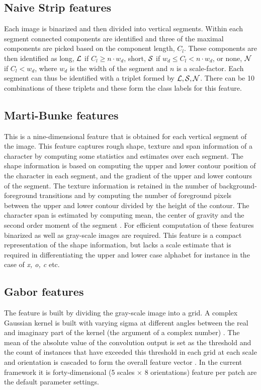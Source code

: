 \documentclass[runningheads]{llncs}
\def\L{{\cal L}}
\def\S{{\cal S}}
\def\N{{\cal N}}
\begin{document}
\subsection{Naive Strip features}
\label{ssec:nsf}
Each image is binarized and then divided into vertical segments. Within each segment connected components are identified and three of the maximal components are picked based on the component length, $C_l$. These components are then identified as long, $\L$ if $C_l \ge n\cdot w_d$, short, $\S$ if $w_d \le C_l < n \cdot w_d$, or none, $\N$ if $ C_l < w_d$, where $w_d$ is the width of the segment and $n$ is a scale-factor. Each segment can thus be identified with a triplet formed by $\L,\S,\N$. There can be 10 combinations of these triplets and these form the class labels for this feature.

\subsection{Marti-Bunke features}
\label{ssec:mbf}
This is a nine-dimensional feature that is obtained for each vertical segment of the image. This feature captures rough shape, texture and span information of a character by computing some statistics and estimates over each segment. The shape information is based on computing the upper and lower contour position of the character in each segment, and the gradient of the upper and lower contours of the segment. The texture information is retained in the number of background-foreground transitions and by computing the number of foreground pixels between the upper and lower contour divided by the height of the contour. The character span is estimated by computing mean, the center of gravity and the second order moment of the segment \cite{MartiBunke02}. For efficient computation of these features binarized as well as gray-scale images are required. This feature is a compact representation of the shape information, but lacks a scale estimate that is required in differentiating the upper and lower case alphabet for instance in the case  of \emph{x, o, c} etc.

\subsection{Gabor features}
\label{ssec:gbf}
The feature is built by dividing the gray-scale image into a grid. A complex Gaussian kernel is built with varying sigma at different angles between the real and imaginary part of the kernel (the argument of a complex number) \cite{CCPBN10}. The mean of the absolute value of the convolution output is set as the threshold and the count of instances that have exceeded this threshold in each grid at each scale and orientation is cascaded to form the overall feature vector \cite{LKF05}. In the current framework it is forty-dimensional (5 scales $\times$ 8 orientations) feature per patch are the default parameter settings.
\end{document}

